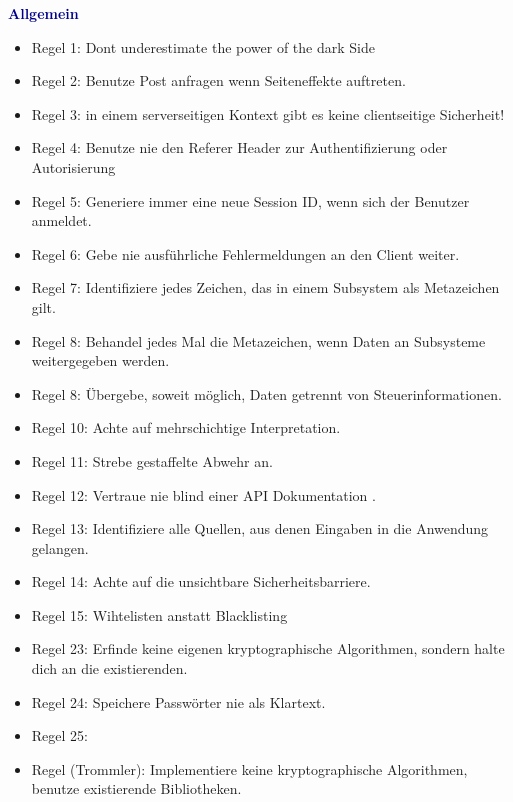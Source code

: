 	\textbf{\textcolor{darkblue}{ Allgemein}}~
	\begin{itemize}
	
\item	Regel 1: Dont underestimate the power of the dark Side
\item	Regel 2: Benutze Post anfragen wenn Seiteneffekte auftreten.
\item	Regel 3: in einem serverseitigen Kontext gibt es keine clientseitige Sicherheit!
\item	Regel 4: Benutze nie den Referer Header zur Authentifizierung oder Autorisierung
\item	Regel 5: Generiere immer eine neue Session ID, wenn sich der Benutzer anmeldet.
\item	Regel 6: Gebe nie ausführliche Fehlermeldungen an den Client weiter.
\item	Regel 7: Identifiziere jedes Zeichen, das in einem Subsystem als Metazeichen gilt.
\item	Regel 8: Behandel jedes Mal die Metazeichen, wenn Daten an Subsysteme weitergegeben werden.
\item	Regel 8: Übergebe, soweit möglich, Daten getrennt von Steuerinformationen.
\item	Regel 10: Achte auf mehrschichtige Interpretation.
\item	Regel 11: Strebe gestaffelte Abwehr an.
\item	Regel 12: Vertraue nie blind einer API Dokumentation .
\item	Regel 13: Identifiziere alle Quellen, aus denen Eingaben in die Anwendung gelangen.
\item	Regel 14: Achte auf die unsichtbare Sicherheitsbarriere.
\item	Regel 15: Wihtelisten anstatt Blacklisting
\item	Regel 23: Erfinde keine eigenen kryptographische Algorithmen, sondern halte dich an die existierenden.
\item	Regel 24: Speichere Passwörter nie als Klartext.
\item	Regel 25: 	
\item   Regel (Trommler): Implementiere keine kryptographische Algorithmen, benutze existierende Bibliotheken.

	\end{itemize}
